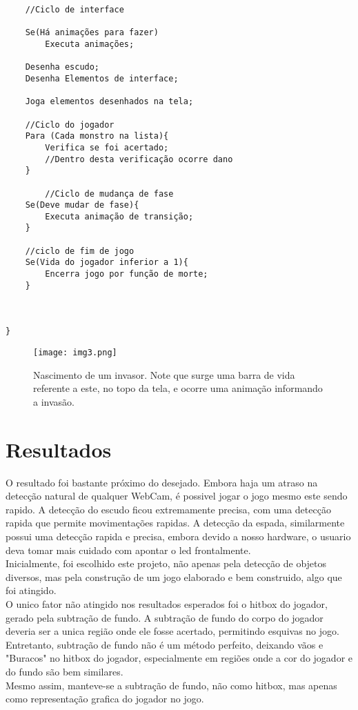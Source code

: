 \documentclass[12pt]{article}
\begin{document}
\begin{lstlisting}
    //Ciclo de interface
    
    Se(Há animações para fazer)
        Executa animações;
        
    Desenha escudo;
    Desenha Elementos de interface;
    
    Joga elementos desenhados na tela;
    
    //Ciclo do jogador
    Para (Cada monstro na lista){
        Verifica se foi acertado;
        //Dentro desta verificação ocorre dano
    }
    
        //Ciclo de mudança de fase
    Se(Deve mudar de fase){
        Executa animação de transição;
    }
    
    //ciclo de fim de jogo
    Se(Vida do jogador inferior a 1){
        Encerra jogo por função de morte;
    }
    

    
}
\end{lstlisting}

\begin{figure}[ht!]
\centering
\texttt{[image: img3.png]}
\caption{Nascimento de um invasor. Note que surge uma barra de vida referente a este, no topo da tela, e ocorre uma animação informando a invasão.}
\label{fig:img3}
\end{figure}


\section{Resultados}

O resultado foi bastante próximo do desejado. Embora haja um atraso na detecção natural de qualquer WebCam, é possivel jogar o jogo mesmo este sendo rapido.
A detecção do escudo ficou extremamente precisa, com uma detecção rapida que permite movimentações rapidas. A detecção da espada, similarmente possui uma detecção rapida e precisa, embora devido a nosso hardware, o usuario deva tomar mais  cuidado com apontar o led frontalmente.\\
Inicialmente, foi escolhido este projeto, não apenas pela detecção de objetos diversos, mas pela construção de um jogo elaborado e bem construido, algo que foi atingido.\\
O unico fator não atingido nos resultados esperados foi o hitbox do jogador, gerado pela subtração de fundo. A subtração de fundo do corpo do jogador deveria ser a unica região onde ele fosse acertado, permitindo esquivas no jogo.
Entretanto, subtração de fundo não é um método perfeito, deixando vãos e "Buracos" no hitbox do jogador, especialmente em regiões onde a cor do jogador e do fundo são bem similares.\\
Mesmo assim, manteve-se a subtração de fundo, não como hitbox, mas apenas como representação grafica do jogador no jogo.
\end{document}
